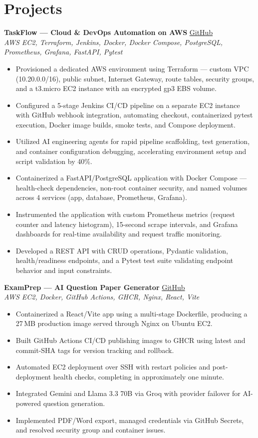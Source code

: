 \documentclass[a4paper,10pt]{article}
\newcommand{\projectHeading}[3]{%
  \vspace{1.5pt}
  \textbf{#1} \enspace \href{#2}{GitHub}\\[-1pt]
  {\small\textit{#3}}
  \vspace{0.5pt}
}
\begin{document}
\section{Projects}

\projectHeading
  {TaskFlow --- Cloud \& DevOps Automation on AWS}
  {https://github.com/senthamizhvelan04/taskflow-devops.git}
  {AWS EC2, Terraform, Jenkins, Docker, Docker Compose, PostgreSQL, Prometheus, Grafana, FastAPI, Pytest}

\begin{itemize}
  \item Provisioned a dedicated AWS environment using Terraform --- custom VPC (10.20.0.0/16), public subnet, Internet Gateway, route tables, security groups, and a t3.micro EC2 instance with an encrypted gp3 EBS volume.
  \item Configured a 5-stage Jenkins CI/CD pipeline on a separate EC2 instance with GitHub webhook integration, automating checkout, containerized pytest execution, Docker image builds, smoke tests, and Compose deployment.
  \item Utilized AI engineering agents for rapid pipeline scaffolding, test generation, and container configuration debugging, accelerating environment setup and script validation by 40\%.
  \item Containerized a FastAPI/PostgreSQL application with Docker Compose --- health-check dependencies, non-root container security, and named volumes across 4 services (app, database, Prometheus, Grafana).
  \item Instrumented the application with custom Prometheus metrics (request counter and latency histogram), 15-second scrape intervals, and Grafana dashboards for real-time availability and request traffic monitoring.
  \item Developed a REST API with CRUD operations, Pydantic validation, health/readiness endpoints, and a Pytest test suite validating endpoint behavior and input constraints.
\end{itemize}

\projectHeading
  {ExamPrep --- AI Question Paper Generator}
  {https://github.com/senthamizhvelan04/Question-paper-generator}
  {AWS EC2, Docker, GitHub Actions, GHCR, Nginx, React, Vite}

\begin{itemize}
  \item Containerized a React/Vite app using a multi-stage Dockerfile, producing a 27\,MB production image served through Nginx on Ubuntu EC2.
  \item Built GitHub Actions CI/CD publishing images to GHCR using latest and commit-SHA tags for version tracking and rollback.
  \item Automated EC2 deployment over SSH with restart policies and post-deployment health checks, completing in approximately one minute.
  \item Integrated Gemini and Llama 3.3 70B via Groq with provider failover for AI-powered question generation.
  \item Implemented PDF/Word export, managed credentials via GitHub Secrets, and resolved security group and container issues.
\end{itemize}
\end{document}
